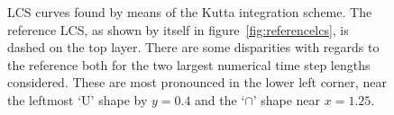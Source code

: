 \begin{figure}[htpb]
    \centering
    
    \caption[LCS curves found by means of the Kutta integration scheme]{
        LCS curves found by means of the Kutta integration scheme. The
        reference LCS, as shown by itself in figure~\ref{fig:referencelcs},
        is dashed on the top layer. There are some disparities with
        regards to the reference both for the two largest numerical
        time step lengths considered. These are most pronounced in the lower
        left corner, near the leftmost `U' shape by $y=0.4$ and the `$\cap$'
        shape near $x=1.25$.}
    \label{fig:lcs_rk3}
\end{figure}
